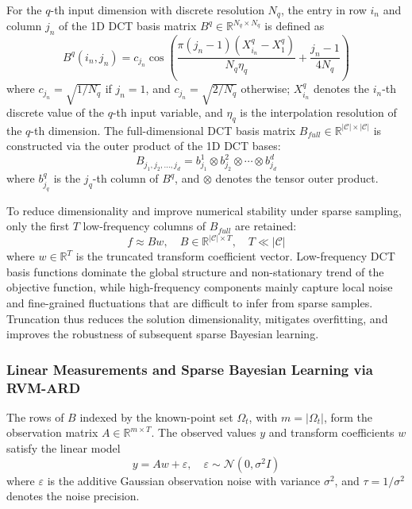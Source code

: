 \documentclass[lettersize,journal]{IEEEtran}
\begin{document}
For the $q$-th input dimension with discrete resolution $N_q$, the entry in row $i_n$ and column $j_n$ of the 1D DCT basis matrix $B^q \in \mathbb{R}^{N_q \times N_q}$ is defined as
\begin{equation}
B^q(i_n,j_n)
=c_{j_n}\cos\left(
\frac{\pi(j_n-1)(X_{i_n}^q-X_1^q)}{N_q\eta_q}
+\frac{j_n-1}{4N_q}
\right)
\end{equation}
where $c_{j_n} = \sqrt{1/N_q}$ if $j_n=1$, and $c_{j_n} = \sqrt{2/N_q}$ otherwise; $X_{i_n}^q$ denotes the $i_n$-th discrete value of the $q$-th input variable, and $\eta_q$ is the interpolation resolution of the $q$-th dimension. The full-dimensional DCT basis matrix $B_{full} \in \mathbb{R}^{|\mathcal{C}| \times |\mathcal{C}|}$ is constructed via the outer product of the 1D DCT bases:
\begin{equation}
B_{j_1,j_2,...,j_d} = b_{j_1}^1 \otimes b_{j_2}^2 \otimes \cdots \otimes b_{j_d}^d
\end{equation}
where $b_{j_q}^q$ is the $j_q$-th column of $B^q$, and $\otimes$ denotes the tensor outer product.

To reduce dimensionality and improve numerical stability under sparse sampling, only the first $T$ low-frequency columns of $B_{full}$ are retained:
\begin{equation}
f \approx B w, \quad B \in \mathbb{R}^{|\mathcal{C}| \times T}, \quad T \ll |\mathcal{C}|
\end{equation}
where $w \in \mathbb{R}^T$ is the truncated transform coefficient vector. Low-frequency DCT basis functions dominate the global structure and non-stationary trend of the objective function, while high-frequency components mainly capture local noise and fine-grained fluctuations that are difficult to infer from sparse samples. Truncation thus reduces the solution dimensionality, mitigates overfitting, and improves the robustness of subsequent sparse Bayesian learning.

\subsubsection{Linear Measurements and Sparse Bayesian Learning via RVM-ARD}
The rows of $B$ indexed by the known-point set $\Omega_t$, with $m=|\Omega_t|$, form the observation matrix $A \in \mathbb{R}^{m \times T}$. The observed values $y$ and transform coefficients $w$ satisfy the linear model
\begin{equation}
y = A w + \varepsilon, \quad \varepsilon \sim \mathcal{N}(0, \sigma^2 I)
\end{equation}
where $\varepsilon$ is the additive Gaussian observation noise with variance $\sigma^2$, and $\tau = 1/\sigma^2$ denotes the noise precision.
\end{document}
